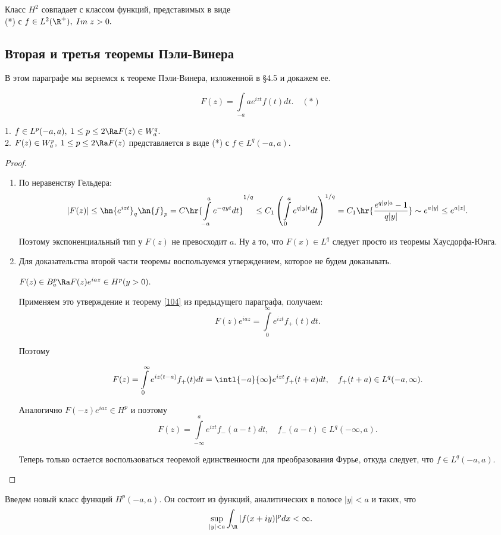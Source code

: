 \documentclass[a4paper]{article}
\begin{document}
\begin{theorem}
Класс $H^2$ совпадает с классом функций, представимых в виде \\\hangindent=6.5cm (*) с $f\in
L^2(\R ^+),\;Im\;z>0.$
\end{theorem}

\subsection{Вторая и третья теоремы Пэли-Винера}
В этом параграфе мы вернемся к теореме Пэли-Винера, изложенной в \S4.5 и докажем ее.

$$F(z)=\int\limits_{-a}a e^{izt}f(t)dt.\quad(*)$$

\begin{theorem}
1. $f\in L^p(-a,a),\;1\le p \le2\Ra F(z)\in W^q_a.$ \\\hangindent=2.5cm 2. $F(z)\in W^p_a,\;1\le
p\le2\Ra F(z)$ представляется в виде (*) с $f\in L^q(-a,a).$
\end{theorem}
\begin{proof}

  \begin{enumerate}
  \item
    По неравенству Гельдера:
    $$|F(z)|\le\hn{e^{izt}}_q\hn{f}_p=C\hr{\int\limits_{-a}^a e^{-qyt}dt}^{1/q}\le C_1\left(\int\limits_0^a
    e^{q|y|t}dt\right)^{1/q}=C_1\hr{\frac{e^{q|y|a}-1}{q|y|}}\sim e^{a|y|}\le e^{a|z|}.$$

    Поэтому экспоненциальный тип у $F(z)$ не превосходит $a.$ Ну а то, что $F(x)\in L^q$ следует просто из
    теоремы Хаусдорфа-Юнга.
  \item
    Для доказательства второй части теоремы воспользуемся утверждением, которое не будем доказывать.

    \begin{stm}
      $F(z)\in B^p_a\Ra F(z)e^{iaz}\in H^p (y>0).$
    \end{stm}

    Применяем это утверждение и теорему \ref{104} из предыдущего параграфа, получаем:
    $$F(z)e^{iaz}=\int\limits_0^{\infty}e^{izt}f_+(t)dt.$$

    Поэтому

    $$F(z)=\int\limits_0^{\infty}e^{iz(t-a)}f_+(t)dt=\intl{-a}{\infty}e^{izt}f_+(t+a)dt,\quad f_+(t+a)\in L^q(-a,\infty).$$

    Аналогично $F(-z)e^{iaz}\in H^p$ и поэтому
    $$F(z)=\int\limits_{-\infty}^a e^{izt}f_-(a-t)dt,\quad f_-(a-t)\in L^q(-\infty,a).$$

    Теперь только остается воспользоваться теоремой единственности для преобразования Фурье, откуда следует, что
    $f\in L^q(-a,a).$

  \end{enumerate}
\end{proof}
Введем новый класс функций $H^p(-a,a)$. Он состоит из функций, аналитических в полосе $|y|<a$ и таких, что
$$\sup_{|y|<a}\int_{\R }|f(x+iy)|^pdx<\infty.$$
\end{document}
